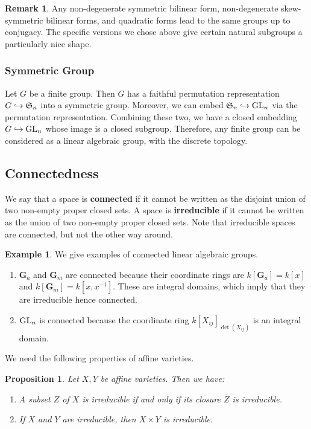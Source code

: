 \documentclass[]{pcmi}
\theoremstyle{plain}
\newtheorem{Proposition}[equation]{Proposition}
\theoremstyle{definition}
\newtheorem{Example}[equation]{Example}
\newtheorem{Remark}[equation]{Remark}
\begin{document}
\begin{Remark}
    Any non-degenerate symmetric bilinear form, non-degenerate skew-symmetric bilinear forms, and quadratic forms lead to the same groups up to conjugacy. The specific versions we chose above give certain natural subgroups a particularly nice shape. 
\end{Remark}

\subsubsection{Symmetric Group}

Let $G$ be a finite group. Then $G$ has a faithful permutation representation $G \hookrightarrow \mathfrak{S}_n$ into a symmetric group. Moreover, we can embed $\mathfrak{S}_n \hookrightarrow \operatorname{GL}_n$ via the permutation representation. Combining these two, we have a closed embedding $G \hookrightarrow \operatorname{GL}_n$ whose image is a closed subgroup. Therefore, any finite group can be considered as a linear algebraic group, with the discrete topology. 

\subsection{Connectedness}

We say that a space is \textbf{connected} if it cannot be written as the disjoint union of two non-empty proper closed sets. A space is \textbf{irreducible} if it cannot be written as the union of two non-empty proper closed sets. Note that irreducible spaces are connected, but not the other way around. 

\begin{Example}
    We give examples of connected linear algebraic groups. 
    \begin{enumerate}
        \item $\mathbf{G}_a$ and $\mathbf{G}_m$ are connected because their coordinate rings are $k[\mathbf{G}_a] = k[x]$ and $k[\mathbf{G}_m] = k[x, x^{-1}]$. These are integral domains, which imply that they are irreducible hence connected. 

        \item $\operatorname{GL}_n$ is connected because the coordinate ring $k[X_{ij}]_{\det(X_{ij})}$ is an integral domain. 
    \end{enumerate}
\end{Example}

We need the following properties of affine varieties. 

\begin{Proposition}
    Let $X, Y$ be affine varieties. Then we have:
    \begin{enumerate}[label = (\alph*)]
        \item A subset $Z$ of $X$ is irreducible if and only if its closure $\overline{Z}$ is irreducible. 
        \item If $X$ and $Y$ are irreducible, then $X \times Y$ is irreducible. 
    \end{enumerate}
\end{Proposition}
\end{document}
